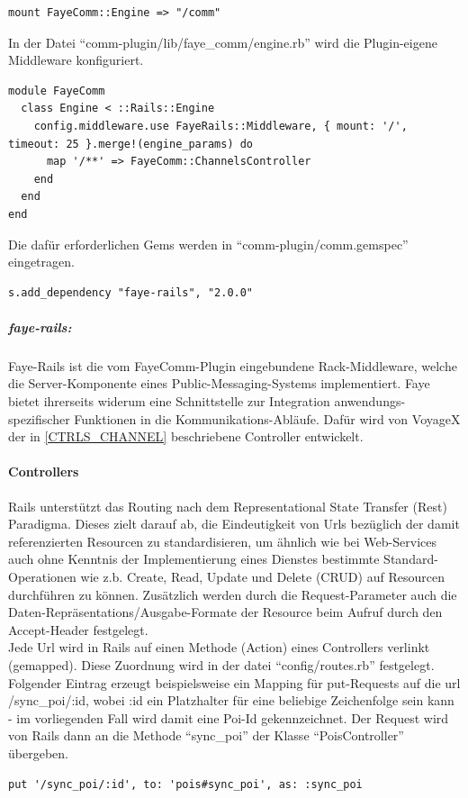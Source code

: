 \begin{lstlisting}[frame=single,xleftmargin=0pt,numbers=none]
  mount FayeComm::Engine => "/comm"
\end{lstlisting}
In der Datei "`comm-plugin/lib/faye\_comm/engine.rb"' wird die Plugin-eigene Middleware konfiguriert. 
\lstset{language=CoffeeScript}
\begin{lstlisting}[frame=single,xleftmargin=0pt,numbers=none]
module FayeComm
  class Engine < ::Rails::Engine
    config.middleware.use FayeRails::Middleware, { mount: '/', timeout: 25 }.merge!(engine_params) do
      map '/**' => FayeComm::ChannelsController
    end
  end
end
\end{lstlisting}
Die dafür erforderlichen Gems werden in "`comm-plugin/comm.gemspec"' eingetragen.
\lstset{language=CoffeeScript}
\begin{lstlisting}[frame=single,xleftmargin=0pt,numbers=none]
  s.add_dependency "faye-rails", "2.0.0"
\end{lstlisting}

\subparagraph{faye-rails:}\label{FAYERAILS}Faye-Rails ist die vom FayeComm-Plugin eingebundene Rack-Middleware, welche
die Server-Komponente eines Public-Messaging-Systems implementiert. Faye bietet ihrerseits widerum eine Schnittstelle zur Integration anwendungs-spezifischer Funktionen in die Kommunikations-Abläufe. Dafür wird von VoyageX der in \ref{CTRLS_CHANNEL} beschriebene Controller entwickelt.
 
\paragraph{Controllers}\noindent
Rails unterstützt das Routing nach dem Representational State Transfer (Rest) Paradigma. Dieses zielt darauf ab, die Eindeutigkeit von Urls bezüglich der damit referenzierten Resourcen zu standardisieren, um ähnlich wie bei Web-Services auch ohne Kenntnis der Implementierung eines Dienstes bestimmte Standard-Operationen wie z.b. Create, Read, Update und Delete (CRUD) auf Resourcen durchführen zu können. Zusätzlich werden durch die Request-Parameter auch die Daten-Repräsentations/Ausgabe-Formate der Resource beim Aufruf durch den Accept-Header festgelegt.\\
Jede Url wird in Rails auf einen Methode (Action) eines Controllers verlinkt (gemapped). Diese Zuordnung
wird in der datei "`config/routes.rb"' festgelegt.\\
Folgender Eintrag erzeugt beispielsweise ein Mapping für put-Requests auf die url /sync\_poi/:id, wobei :id ein Platzhalter für eine beliebige Zeichenfolge sein kann - im vorliegenden Fall wird damit eine Poi-Id gekennzeichnet. Der Request wird von Rails dann an die Methode "`sync\_poi"' der Klasse "`PoisController"' übergeben.\\
\begin{lstlisting}[frame=single,xleftmargin=0pt,numbers=none,caption={Konfiguration einer Url in conf/routes.rb},captionpos=b]
  put '/sync_poi/:id', to: 'pois#sync_poi', as: :sync_poi
\end{lstlisting}


